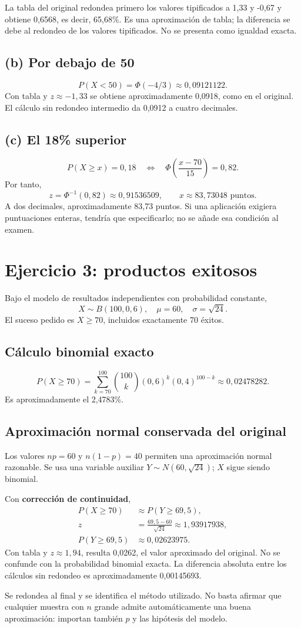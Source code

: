 \documentclass[11pt]{article}
\begin{document}
La tabla del original redondea primero los valores tipificados a 1,33 y -0,67 y obtiene 0,6568, es decir, 65,68\%. Es una aproximación de tabla; la diferencia se debe al redondeo de los valores tipificados. No se presenta como igualdad exacta.
\subsection*{(b) Por debajo de 50}
\[P(X<50)=\Phi(-4/3)\approx\boxed{0{,}09121122}.\]
Con tabla y $z\approx-1{,}33$ se obtiene aproximadamente 0,0918, como en el original. El cálculo sin redondeo intermedio da 0,0912 a cuatro decimales.
\subsection*{(c) El 18\% superior}
\[P(X\geq x)=0{,}18\quad\Longleftrightarrow\quad\Phi\left(\frac{x-70}{15}\right)=0{,}82.\]
Por tanto,
\[z=\Phi^{-1}(0{,}82)\approx0{,}91536509,\qquad
\boxed{x\approx83{,}73048\text{ puntos}}.\]
A dos decimales, aproximadamente 83,73 puntos. Si una aplicación exigiera puntuaciones enteras, tendría que especificarlo; no se añade esa condición al examen.
\clearpage
\section*{Ejercicio 3: productos exitosos}
Bajo el modelo de resultados independientes con probabilidad constante,
\[X\sim B(100,0{,}6),\quad\mu=60,\quad\sigma=\sqrt{24}.\]
El suceso pedido es $X\geq70$, incluidos exactamente 70 éxitos.
\subsection*{Cálculo binomial exacto}
\[P(X\geq70)=\sum_{k=70}^{100}\binom{100}{k}(0{,}6)^k(0{,}4)^{100-k}
\approx\boxed{0{,}02478282}.\]
Es aproximadamente el 2,4783\%.
\subsection*{Aproximación normal conservada del original}
Los valores $np=60$ y $n(1-p)=40$ permiten una aproximación normal razonable. Se usa una variable auxiliar $Y\sim N(60,\sqrt{24})$; $X$ sigue siendo binomial.

Con \textbf{corrección de continuidad},
\begin{align*}
P(X\geq70)&\approx P(Y\geq69{,}5),\\
z&=\frac{69{,}5-60}{\sqrt{24}}\approx1{,}93917938,\\
P(Y\geq69{,}5)&\approx\boxed{0{,}02623975}.
\end{align*}
Con tabla y $z\approx1{,}94$, resulta 0,0262, el valor aproximado del original. No se confunde con la probabilidad binomial exacta. La diferencia absoluta entre los cálculos sin redondeo es aproximadamente 0,00145693.

Se redondea al final y se identifica el método utilizado. No basta afirmar que cualquier muestra con $n$ grande admite automáticamente una buena aproximación: importan también $p$ y las hipótesis del modelo.
\end{document}
